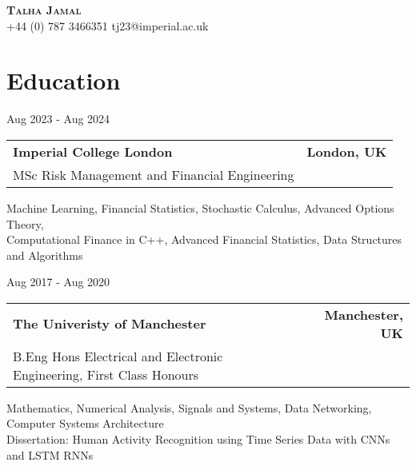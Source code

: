 \documentclass[letterpaper,11pt]{article}
\makeatletter
\newcommand{\resumeSubheading}[4]{
  \vspace{-9pt}%
    \begin{tabular*}{0.97\textwidth}[t]{l@{\extracolsep{\fill}}r}
      \textbf{\small{#1}} & \textbf{\small{#2}} \\
      {\small#3} & {\small #4} \\
    \end{tabular*}\vspace{-7pt}
}
\makeatother
\begin{document}
\begin{flushright}
  \vspace{-4pt}
  \color{gray}
  \item
\end{flushright}

\vspace{-7pt}

\begin{center}
    \textbf{\Large \scshape Talha Jamal} \\ \vspace{5pt}
    \small 
    {{+44 (0) 787 3466351}}
    \quad
    \quad
    {{tj23@imperial.ac.uk}}
\end{center}


\section{Education}
\begin{minipage}[t]{0.1\textwidth}
\raggedright %
\small{Aug 2023 - Aug 2024}
\end{minipage}%
\begin{minipage}[t]{0.9\textwidth}
\begin{adjustwidth}{0.5cm}{0cm} %

\resumeSubheading 
      {Imperial College London}{London, UK}
      {MSc Risk Management and Financial Engineering}{}

    \vspace{2pt}
      \small{Machine Learning, Financial Statistics, Stochastic Calculus, Advanced Options Theory, \\Computational Finance in C++, Advanced Financial Statistics, Data Structures and Algorithms}\\

\end{adjustwidth}
\end{minipage}

\begin{minipage}[t]{0.1\textwidth}
\raggedright %
\small{Aug 2017 - Aug 2020}
\end{minipage}%
\begin{minipage}[t]{0.9\textwidth}
\begin{adjustwidth}{0.5cm}{0cm} %

\resumeSubheading
      {The Univeristy of Manchester}{Manchester, UK}
      {B.Eng Hons Electrical and Electronic Engineering, First Class Honours}{}
      
    \vspace{2pt}
      \small{Mathematics, Numerical Analysis, Signals and Systems, Data Networking, Computer Systems Architecture}
      \\
      \small{Dissertation: Human Activity Recognition using Time Series Data with CNNs and LSTM RNNs}
      
\end{adjustwidth}
\end{minipage}
\end{document}
